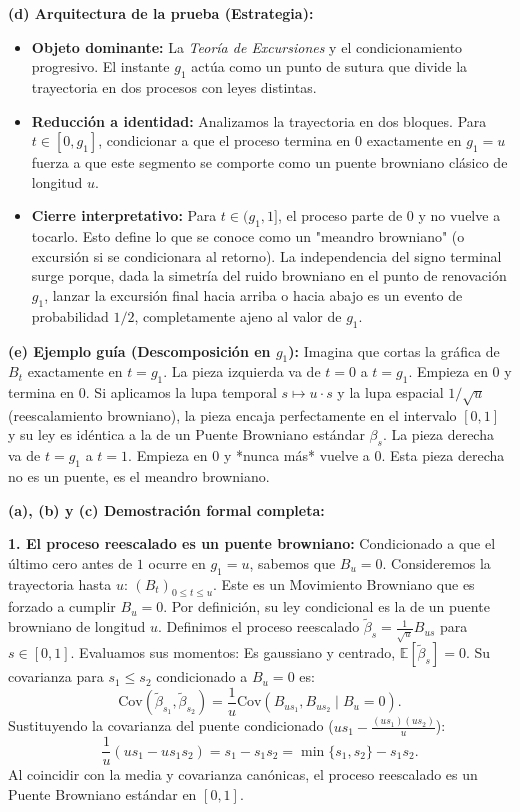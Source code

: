 \documentclass[11pt, letterpaper]{article}
\begin{document}
\begin{solucion}
    \textbf{(d) Arquitectura de la prueba (Estrategia):}
    \begin{itemize}
        \item[(i)] \textbf{Objeto dominante:} La \textit{Teoría de Excursiones} y el condicionamiento progresivo. El instante $g_1$ actúa como un punto de sutura que divide la trayectoria en dos procesos con leyes distintas.
        \item[(ii)] \textbf{Reducción a identidad:} Analizamos la trayectoria en dos bloques. Para $t \in [0, g_1]$, condicionar a que el proceso termina en $0$ exactamente en $g_1=u$ fuerza a que este segmento se comporte como un puente browniano clásico de longitud $u$.
        \item[(iii)] \textbf{Cierre interpretativo:} Para $t \in (g_1, 1]$, el proceso parte de 0 y no vuelve a tocarlo. Esto define lo que se conoce como un "meandro browniano" (o excursión si se condicionara al retorno). La independencia del signo terminal surge porque, dada la simetría del ruido browniano en el punto de renovación $g_1$, lanzar la excursión final hacia arriba o hacia abajo es un evento de probabilidad $1/2$, completamente ajeno al valor de $g_1$.
    \end{itemize}

    \vspace{3mm}
    \textbf{(e) Ejemplo guía (Descomposición en $g_1$):}
    Imagina que cortas la gráfica de $B_t$ exactamente en $t = g_1$.
    La pieza izquierda va de $t=0$ a $t=g_1$. Empieza en 0 y termina en 0. Si aplicamos la lupa temporal $s \mapsto u \cdot s$ y la lupa espacial $1/\sqrt{u}$ (reescalamiento browniano), la pieza encaja perfectamente en el intervalo $[0,1]$ y su ley es idéntica a la de un Puente Browniano estándar $\beta_s$.
    La pieza derecha va de $t=g_1$ a $t=1$. Empieza en 0 y *nunca más* vuelve a 0. Esta pieza derecha no es un puente, es el meandro browniano.

    \textbf{(a), (b) y (c) Demostración formal completa:}

    \textbf{1. El proceso reescalado es un puente browniano:}
    Condicionado a que el último cero antes de $1$ ocurre en $g_1 = u$, sabemos que $B_u = 0$.
    Consideremos la trayectoria hasta $u$: $(B_t)_{0 \le t \le u}$. Este es un Movimiento Browniano que es forzado a cumplir $B_u = 0$. Por definición, su ley condicional es la de un puente browniano de longitud $u$.
    Definimos el proceso reescalado $\tilde{\beta}_s = \frac{1}{\sqrt{u}} B_{us}$ para $s \in [0,1]$.
    Evaluamos sus momentos:
    Es gaussiano y centrado, $\mathbb{E}[\tilde{\beta}_s] = 0$.
    Su covarianza para $s_1 \le s_2$ condicionado a $B_u = 0$ es:
    \[ \text{Cov}(\tilde{\beta}_{s_1}, \tilde{\beta}_{s_2}) = \frac{1}{u} \text{Cov}(B_{us_1}, B_{us_2} \mid B_u = 0). \]
    Sustituyendo la covarianza del puente condicionado ($u s_1 - \frac{(us_1)(us_2)}{u}$):
    \[ \frac{1}{u} \left( u s_1 - u s_1 s_2 \right) = s_1 - s_1 s_2 = \min\{s_1, s_2\} - s_1 s_2. \]
    Al coincidir con la media y covarianza canónicas, el proceso reescalado es un Puente Browniano estándar en $[0,1]$.


\end{solucion}
\end{document}
